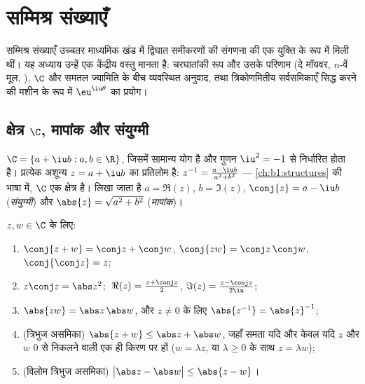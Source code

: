 \chapter{सम्मिश्र संख्याएँ}\label{ch:b1:complex}

सम्मिश्र संख्याएँ उच्चतर माध्यमिक खंड में द्विघात समीकरणों की संगणना की एक
युक्ति के रूप में मिली थीं। यह अध्याय उन्हें एक केंद्रीय वस्तु मानता है:
चरघातांकी रूप और उसके परिणाम (दे मॉयवर, $n$-वें मूल, ), $\C$ और
समतल ज्यामिति के बीच व्यवस्थित अनुवाद, तथा त्रिकोणमितीय सर्वसमिकाएँ सिद्ध
करने की मशीन के रूप में $\eu^{\iu\theta}$ का प्रयोग।

\section{क्षेत्र $\C$, मापांक और संयुग्मी}

\begin{definition}[सम्मिश्र क्षेत्र]\label{def:b1:complex:field}
$\C = \{a + \iu b : a, b \in \R\}$, जिसमें सामान्य योग है और गुणन $\iu^2 =
-1$ से निर्धारित होता है। प्रत्येक अशून्य $z = a + \iu b$ का प्रतिलोम है:
$z^{-1} = \frac{a - \iu b}{a^2 + b^2}$ --- \cref{ch:b1:structures} की भाषा
में, $\C$ एक क्षेत्र है। लिखा जाता है $a = \Re(z)$, $b = \Im(z)$, $\conj{z}
= a - \iu b$ (\emph{संयुग्मी}) और $\abs{z} = \sqrt{a^2 +
b^2}$ (\emph{मापांक})।
\end{definition}

\begin{proposition}[संयुग्मी और मापांक के नियम]\label{prop:b1:complex:rules}
$z, w \in \C$ के लिए:
\begin{enumerate}
  \item $\conj{z + w} = \conj z + \conj w$, $\conj{zw} = \conj z\,
        \conj w$, $\conj{\conj z} = z$;
  \item $z \conj z = \abs z^2$; $\;\Re(z) = \frac{z + \conj z}{2}$,
        $\Im(z) = \frac{z - \conj z}{2\iu}$;
  \item $\abs{zw} = \abs z\, \abs w$, और $z \neq 0$ के लिए $\abs{z^{-1}} =
  \abs{z}^{-1}$;
  \item (त्रिभुज असमिका) $\abs{z + w} \leq \abs z +
  \abs w$, जहाँ समता यदि और केवल यदि $z$ और $w$ $0$ से निकलने वाली एक ही
  किरण पर हों ($w = \lambda z$, या $\lambda \geq 0$ के साथ $z = \lambda w$);
  \item (विलोम त्रिभुज असमिका) $\bigl|\abs z - \abs w\bigr| \leq \abs{z -
  w}$।
\end{enumerate}
\end{proposition}

